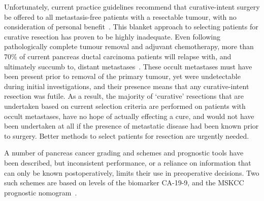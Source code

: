\documentclass[dissertation.tex]{subfiles}
\begin{document}
Unfortunately, current practice guidelines recommend that curative-intent surgery be offered to all metastasis-free patients with a resectable tumour, with no consideration of personal benefit~\cite{Editors2015}.  This blanket approach to selecting patients for curative resection has proven to be highly inadequate.  Even following pathologically complete tumour removal and adjuvant chemotherapy, more than 70\% of current pancreas ductal carcinoma patients will relapse with, and ultimately succumb to, distant metastases~\cite{Barugola2007}.  These occult metastases must have been present prior to removal of the primary tumour, yet were undetectable during initial investigations, and their presence means that any curative-intent resection was futile.  As a result, the majority of `curative' resections that are undertaken based on current selection criteria are performed on patients with occult metastases, have no hope of actually effecting a cure, and would not have been undertaken at all if the presence of metastatic disease had been known prior to surgery.  Better methods to select patients for resection are urgently needed.


A number of pancreas cancer grading and schemes and prognostic tools have been described, but inconsistent performance, or a reliance on information that can only be known postoperatively, limits their use in preoperative decisions.  Two such schemes are based on levels of the biomarker \gls{CA-19-9}, and the \gls{MSKCC} prognostic nomogram~\cite{Brennan2004}.
\end{document}
